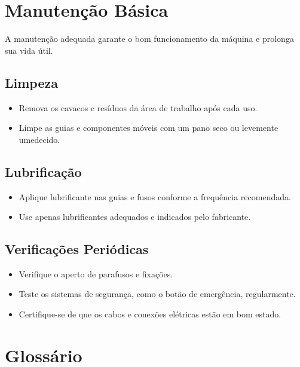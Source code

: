 \documentclass[twoside,a4paper]{refart}
\begin{document}
\section{Manutenção Básica}

A manutenção adequada garante o bom funcionamento da máquina e prolonga sua vida útil.

\subsection{Limpeza}

\begin{itemize} \item Remova os cavacos e resíduos da área de trabalho após cada uso. \item Limpe as guias e componentes móveis com um pano seco ou levemente umedecido. \end{itemize}

\subsection{Lubrificação}

\begin{itemize} \item Aplique lubrificante nas guias e fusos conforme a frequência recomendada. \item Use apenas lubrificantes adequados e indicados pelo fabricante. \end{itemize}

\subsection{Verificações Periódicas}

\begin{itemize} \item Verifique o aperto de parafusos e fixações. \item Teste os sistemas de segurança, como o botão de emergência, regularmente. \item Certifique-se de que os cabos e conexões elétricas estão em bom estado. \end{itemize}

\section*{Glossário}
\end{document}
